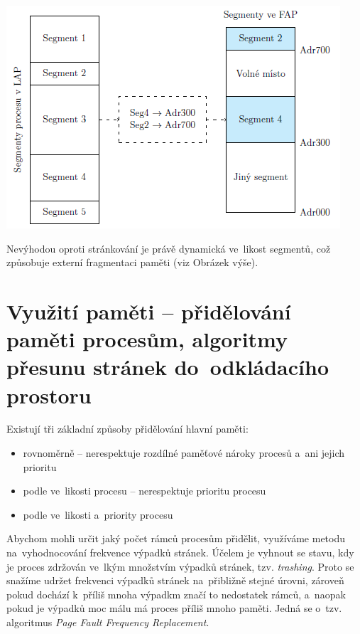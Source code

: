 \begin{center}
	\includegraphics[scale=1]{images/mem_segment_table.png}
\label{mem:segment-table}
\end{center}

Nevýhodou oproti stránkování je právě dynamická ve~likost segmentů, což způsobuje externí fragmentaci paměti (viz Obrázek výše).


\clearpage
\section{Využití paměti -- přidělování paměti procesům, algoritmy přesunu stránek do~odkládacího prostoru}

Existují tři základní způsoby přidělování hlavní paměti:
\begin{itemize}
	\item rovnoměrně -- nerespektuje rozdílné paměťové nároky procesů a~ani jejich prioritu
	\item podle ve~likosti procesu -- nerespektuje prioritu procesu
	\item podle ve~likosti a~priority procesu
\end{itemize}

Abychom mohli určit jaký počet rámců procesům přidělit, využíváme metodu na~vyhodnocování frekvence výpadků stránek. Účelem je vyhnout se stavu, kdy je proces zdržován ve~lkým množstvím výpadků stránek, tzv. \emph{trashing}. Proto se snažíme udržet frekvenci výpadků stránek na~přibližně stejné úrovni, zároveň pokud dochází k~příliš mnoha výpadkm značí to nedostatek rámců, a~naopak pokud je výpadků moc málu má proces příliš mnoho paměti. Jedná se o~tzv. algoritmus \emph{Page Fault Frequency Replacement}. 

